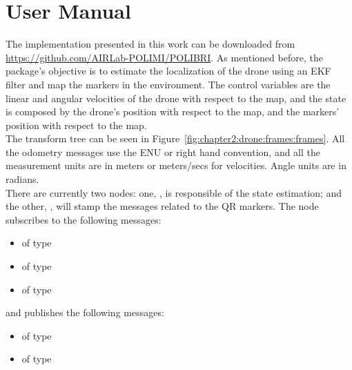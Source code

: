 \chapter{User Manual}
\label{appendix:b}

The implementation presented in this work can be downloaded from \url{https://github.com/AIRLab-POLIMI/POLIBRI}. As mentioned before, the  package's objective is to estimate the localization of the drone using an \ac{EKF} filter and map the markers in the environment. The control variables are the linear and angular velocities of the drone with respect to the map, and the state is composed by the drone's position with respect to the map, and the markers' position with respect to the map.\\

The transform tree can be seen in Figure~\ref{fig:chapter2:drone:frames:frames}. All the odometry messages use the \ac{ENU} or right hand convention, and all the measurement units are in meters or meters/secs for velocities. Angle units are in radians.\\

There are currently two nodes: one, , is responsible of the state estimation; and the other, , will stamp the messages related to the QR markers. The  node subscribes to the following messages:
\begin{itemize}
    \item{ of type }
    \item{ of type }
    \item{ of type }
\end{itemize}
and publishes the following messages:
\begin{itemize}
    \item{ of type }
    \item{ of type }
\end{itemize}


